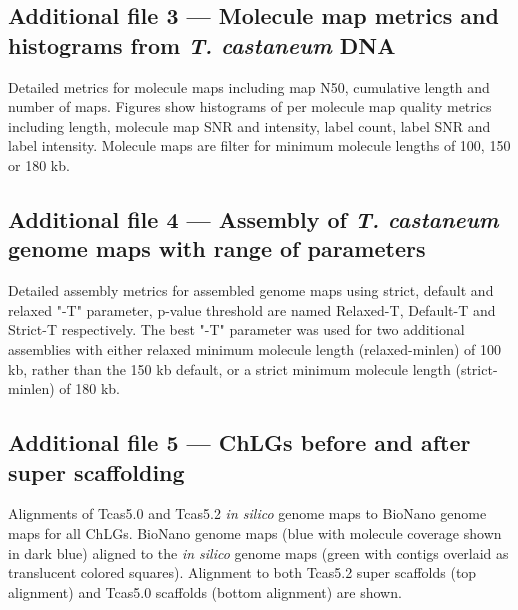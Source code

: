 \documentclass{bmcart}
\begin{document}
\begin{backmatter}
  \subsection*{Additional file 3 --- Molecule map metrics and histograms from \textit{T. castaneum} DNA}
    Detailed metrics for molecule maps including map N50, cumulative length and number of maps. Figures show histograms of per molecule map quality metrics including length, molecule map SNR and intensity, label count, label SNR and label intensity. Molecule maps are filter for minimum molecule lengths of 100, 150 or 180 kb.

  \subsection*{Additional file 4 --- Assembly of \textit{T. castaneum} genome maps with range of parameters}
    Detailed assembly metrics for assembled genome maps using strict, default and relaxed "-T" parameter, p-value threshold are named Relaxed-T, Default-T and Strict-T respectively. The best "-T" parameter was used for two additional assemblies with either relaxed minimum molecule length (relaxed-minlen) of 100 kb, rather than the 150 kb default, or a strict minimum molecule length (strict-minlen) of 180 kb. 

  \subsection*{Additional file 5 --- ChLGs before and after super scaffolding }
    Alignments of Tcas5.0 and Tcas5.2 \textit{in silico} genome maps to BioNano genome maps for all ChLGs. BioNano genome maps (blue with molecule coverage shown in dark blue) aligned to the \textit{in silico} genome maps (green with contigs overlaid as translucent colored squares). Alignment to both Tcas5.2 super scaffolds (top alignment) and Tcas5.0 scaffolds (bottom alignment) are shown.



\end{backmatter}
\end{document}
